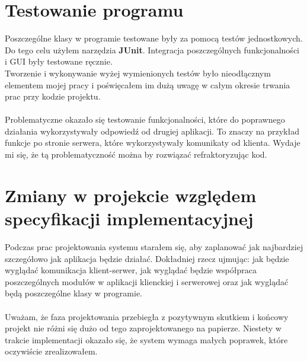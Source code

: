 \documentclass{article}
\begin{document}
\section{Testowanie programu}
    Poszczególne klasy w programie testowane były za pomocą testów jednostkowych.
    Do tego celu użyłem narzędzia \textbf{JUnit}.
    Integracja poszczególnych funkcjonalności i GUI były testowane ręcznie.\\
    Tworzenie i wykonywanie wyżej wymienionych testów było nieodłącznym elementem mojej pracy i poświęcałem im dużą uwagę w całym okresie trwania prac przy kodzie projektu.\\
    \\
    Problematyczne okazało się testowanie funkcjonalności, które do poprawnego działania wykorzystywały odpowiedź od drugiej aplikacji.
    To znaczy na przykład funkcje po stronie serwera, które wykorzystywały komunikaty od klienta.
    Wydaje mi się, że tą problematyczność można by rozwiązać refraktoryzując kod.
    

\section{Zmiany w projekcie względem specyfikacji implementacyjnej}
    Podczas prac projektowania systemu starałem się, aby zaplanować jak najbardziej szczegółowo jak aplikacja będzie działać.
    Dokładniej rzecz ujmując:
        jak będzie wyglądać komunikacja klient-serwer,
        jak wyglądać będzie współpraca poszczególnych modułów w aplikacji klienckiej i serwerowej 
        oraz jak wyglądać będą poszczególne klasy w programie.\\
    \\
    Uważam, że faza projektowania przebiegła z pozytywnym skutkiem i końcowy projekt nie różni się dużo od tego zaprojektowanego na papierze.
    Niestety w trakcie implementacji okazało się, że system wymaga małych poprawek, które oczywiście zrealizowałem.
    
    \newpage
\end{document}
